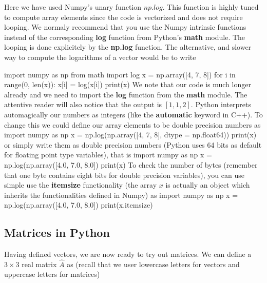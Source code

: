 \documentclass[%
oneside,                 %
final,                   %
10pt]{article}
\begin{document}
Here we have used Numpy's unary function $np.log$. This function is
highly tuned to compute array elements since the code is vectorized
and does not require looping. We normaly recommend that you use the
Numpy intrinsic functions instead of the corresponding \textbf{log} function
from Python's \textbf{math} module. The looping is done explicitely by the
\textbf{np.log} function. The alternative, and slower way to compute the
logarithms of a vector would be to write

\bpycod
import numpy as np
from math import log
x = np.array([4, 7, 8])
for i in range(0, len(x)):
    x[i] = log(x[i])
print(x)
\epycod
We note that our code is much longer already and we need to import the \textbf{log} function from the \textbf{math} module. 
The attentive reader will also notice that the output is $[1, 1, 2]$. Python interprets automagically our numbers as integers (like the \textbf{automatic} keyword in C++). To change this we could define our array elements to be double precision numbers as
\bpycod
import numpy as np
x = np.log(np.array([4, 7, 8], dtype = np.float64))
print(x)
\epycod
or simply write them as double precision numbers (Python uses 64 bits as default for floating point type variables), that is
\bpycod
import numpy as np
x = np.log(np.array([4.0, 7.0, 8.0])
print(x)
\epycod
To check the number of bytes (remember that one byte contains eight bits for double precision variables), you can use simple use the \textbf{itemsize} functionality (the array $x$ is actually an object which inherits the functionalities defined in Numpy) as 
\bpycod
import numpy as np
x = np.log(np.array([4.0, 7.0, 8.0])
print(x.itemsize)
\epycod


\subsection{Matrices in Python}

Having defined vectors, we are now ready to try out matrices. We can
define a $3 \times 3 $ real matrix $\hat{A}$ as (recall that we user
lowercase letters for vectors and uppercase letters for matrices)
\end{document}
